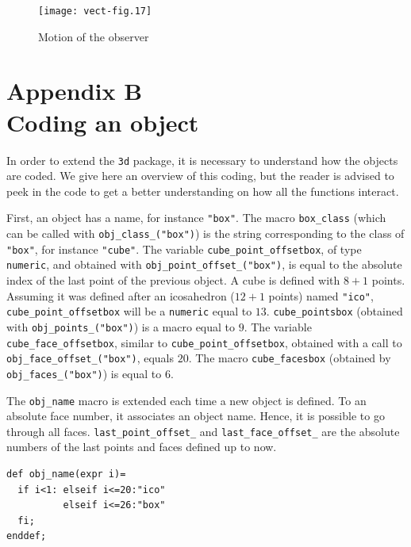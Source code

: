 \documentclass[nonumber,harvardcite]{ltugboat}
\begin{document}
\begin{figure}
\begin{center}
  \texttt{[image: vect-fig.17]}
\end{center}
\caption{Motion of the observer}\label{observer-motion}
\end{figure}

\section{Appendix B\\ 
Coding an object}

In order to extend the \texttt{3d} package, it is necessary to
understand how the objects are coded. We give here an overview of
this coding, but the reader is advised to peek in the code to get
a better understanding on how all the functions interact.

First, an object has a name, for instance \verb|"box"|.
The macro \verb|box_class| (which can be called with \verb|obj_class_("box")|)
is the string corresponding to the class of
\verb|"box"|, for instance \verb|"cube"|.
The variable \verb|cube_point_offsetbox|, of type \texttt{numeric},
and obtained with \verb|obj_point_offset_("box")|,
is equal to the absolute index of the last
point of the previous object. A cube is defined with $8+1$ points. Assuming
it was defined after an icosahedron ($12+1$ points) named
\verb|"ico"|, \verb|cube_point_offsetbox| will be a \verb|numeric| 
equal to $13$. \verb|cube_pointsbox|
(obtained with \verb|obj_points_("box")|) 
is a macro equal to $9$.
The variable \verb|cube_face_offsetbox|, 
similar to \verb|cube_point_offsetbox|, 
obtained with a call to \verb|obj_face_offset_("box")|,
equals $20$.
The macro \verb|cube_facesbox|  
(obtained by \verb|obj_faces_("box")|) 
is equal to $6$.

The \verb|obj_name| macro is extended each time a new object is defined.
To an absolute face number, it associates an object name. Hence, it is possible
to go through all faces. \verb|last_point_offset_| and
\verb|last_face_offset_| are the absolute numbers of the last points and faces
defined up to now.

\begin{verbatim}
def obj_name(expr i)=
  if i<1: elseif i<=20:"ico"
          elseif i<=26:"box"
  fi;
enddef;
\end{verbatim}
\end{document}
